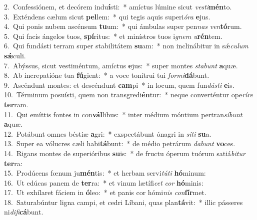 {2.~}Confessiónem, et decórem indu\textbf{í}sti:~* amíctus lúmine sicut \textit{ve}\textit{sti}\textbf{mén}to.\\
{3.~}Exténdens cælum sicut \textbf{pel}lem:~* qui tegis aquis superi\textit{ó}\textit{ra} \textbf{e}jus.\\
{4.~}Qui ponis nubem ascénsum \textbf{tu}um:~* qui ámbulas super pen\textit{nas} \textit{ven}\textbf{tó}rum.\\
{5.~}Qui facis ángelos tuos, \textbf{spí}ritus:~* et minístros tuos i\textit{gnem} \textit{u}\textbf{rén}tem.\\
{6.~}Qui fundásti terram super stabilitátem \textbf{su}am:~* non inclinábitur in sǽ\textit{cu}\textit{lum} \textbf{sǽ}culi.\\
{7.~}Abýssus, sicut vestiméntum, amíctus \textbf{e}jus:~* super montes \textit{sta}\textit{bunt} \textbf{a}quæ.\\
{8.~}Ab increpatióne tua \textbf{fú}gient:~* a voce tonítrui tui \textit{for}\textit{mi}\textbf{dá}bunt.\\
{9.~}Ascéndunt montes: et descéndunt \textbf{cam}pi~* in locum, quem fun\textit{dá}\textit{sti} \textbf{e}is.\\
{10.~}Términum posuísti, quem non transgredi\textbf{én}tur:~* neque converténtur ope\textit{rí}\textit{re} \textbf{ter}ram.\\
{11.~}Qui emíttis fontes in con\textbf{vál}libus:~* inter médium móntium pertran\textit{sí}\textit{bunt} \textbf{a}quæ.\\
{12.~}Potábunt omnes béstiæ \textbf{a}gri:~* exspectábunt ónagri in \textit{si}\textit{ti} \textbf{su}a.\\
{13.~}Super ea vólucres cæli habi\textbf{tá}bunt:~* de médio petrárum \textit{da}\textit{bunt} \textbf{vo}ces.\\
{14.~}Rigans montes de superióribus \textbf{su}is:~* de fructu óperum tuórum satiá\textit{bi}\textit{tur} \textbf{ter}ra:\\
{15.~}Prodúcens fœnum ju\textbf{mén}tis:~* et herbam servi\textit{tú}\textit{ti} \textbf{hó}minum:\\
{16.~}Ut edúcas panem de \textbf{ter}ra:~* et vinum lætífi\textit{cet} \textit{cor} \textbf{hó}minis:\\
{17.~}Ut exhílaret fáciem in \textbf{ó}leo:~* et panis cor hómi\textit{nis} \textit{con}\textbf{fír}met.\\
{18.~}Saturabúntur ligna campi, et cedri Líbani, quas plan\textbf{tá}vit:~* illic pásseres ni\textit{di}\textit{fi}\textbf{cá}bunt.\\
